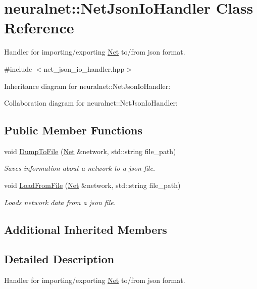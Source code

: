 \hypertarget{classneuralnet_1_1NetJsonIoHandler}{}\section{neuralnet\+:\+:Net\+Json\+Io\+Handler Class Reference}
\label{classneuralnet_1_1NetJsonIoHandler}


Handler for importing/exporting \hyperlink{classneuralnet_1_1Net}{Net} to/from json format.  




{\ttfamily \#include $<$net\+\_\+json\+\_\+io\+\_\+handler.\+hpp$>$}



Inheritance diagram for neuralnet\+:\+:Net\+Json\+Io\+Handler\+:


Collaboration diagram for neuralnet\+:\+:Net\+Json\+Io\+Handler\+:
\subsection*{Public Member Functions}
\begin{DoxyCompactItemize}
\item 
void \hyperlink{classneuralnet_1_1NetJsonIoHandler_a0e8c0b44b686498867ce83835d5811c2}{Dump\+To\+File} (\hyperlink{classneuralnet_1_1Net}{Net} \&network, std\+::string file\+\_\+path)
\begin{DoxyCompactList}\small\item\em Saves information about a network to a json file. \end{DoxyCompactList}\item 
void \hyperlink{classneuralnet_1_1NetJsonIoHandler_af048bd4061be6b8e78d79b54680d9434}{Load\+From\+File} (\hyperlink{classneuralnet_1_1Net}{Net} \&network, std\+::string file\+\_\+path)
\begin{DoxyCompactList}\small\item\em Loads network data from a json file. \end{DoxyCompactList}\end{DoxyCompactItemize}
\subsection*{Additional Inherited Members}


\subsection{Detailed Description}
Handler for importing/exporting \hyperlink{classneuralnet_1_1Net}{Net} to/from json format. 

